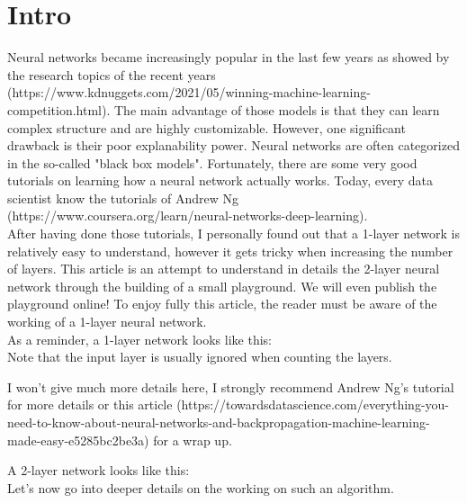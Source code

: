 \section{Intro}

Neural networks became increasingly popular in the last few years as showed by the research topics of the recent years (https://www.kdnuggets.com/2021/05/winning-machine-learning-competition.html). The main advantage of those models is that they can learn complex structure and are highly customizable. However, one significant drawback is their poor explanability power. Neural networks are often categorized in the so-called "black box models".
Fortunately, there are some very good tutorials on learning how a neural network actually works. Today, every data scientist know the tutorials of Andrew Ng (https://www.coursera.org/learn/neural-networks-deep-learning). \\

After having done those tutorials, I personally found out that a 1-layer network is relatively easy to understand, however it gets tricky when increasing the number of layers. This article is an attempt to understand in details the 2-layer neural network through the building of a small playground. We will even publish the playground online! To enjoy fully this article, the reader must be aware of the working of a 1-layer neural network.\\

As a reminder, a 1-layer network looks like this: \\

Note that the input layer is usually ignored when counting the layers.

I won't give much more details here, I strongly recommend Andrew Ng's tutorial for more details or this article (https://towardsdatascience.com/everything-you-need-to-know-about-neural-networks-and-backpropagation-machine-learning-made-easy-e5285bc2be3a) for a wrap up.

A 2-layer network looks like this: \\

Let's now go into deeper details on the working on such an algorithm.

